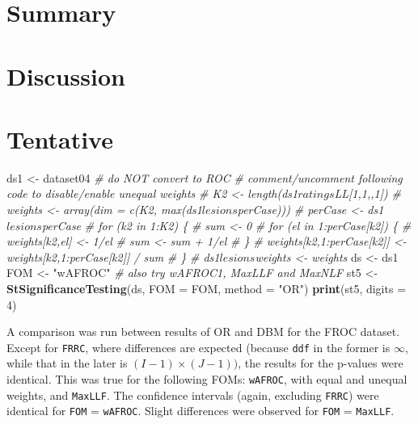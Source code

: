 \documentclass[
]{book}
\newenvironment{Shaded}{\begin{snugshade}}{\end{snugshade}}
\newcommand{\CommentTok}[1]{\textcolor[rgb]{0.56,0.35,0.01}{\textit{#1}}}
\newcommand{\DataTypeTok}[1]{\textcolor[rgb]{0.13,0.29,0.53}{#1}}
\newcommand{\DecValTok}[1]{\textcolor[rgb]{0.00,0.00,0.81}{#1}}
\newcommand{\KeywordTok}[1]{\textcolor[rgb]{0.13,0.29,0.53}{\textbf{#1}}}
\newcommand{\NormalTok}[1]{#1}
\newcommand{\StringTok}[1]{\textcolor[rgb]{0.31,0.60,0.02}{#1}}
\begin{document}
\hypertarget{ORApplications-Summary}{%
\section{Summary}\label{ORApplications-Summary}}

\hypertarget{ORApplications-Discussion}{%
\section{Discussion}\label{ORApplications-Discussion}}

\hypertarget{ToMullOver1-tentative}{%
\section{Tentative}\label{ToMullOver1-tentative}}

\begin{Shaded}
\begin{Highlighting}[]
\NormalTok{ds1 \textless{}{-}}\StringTok{ }\NormalTok{dataset04 }\CommentTok{\# do NOT convert to ROC}
\CommentTok{\# comment/uncomment following code to disable/enable unequal weights}
\CommentTok{\# K2 \textless{}{-} length(ds1$ratings$LL[1,1,,1])}
\CommentTok{\# weights \textless{}{-} array(dim = c(K2, max(ds1$lesions$perCase)))}
\CommentTok{\# perCase \textless{}{-} ds1$lesions$perCase}
\CommentTok{\# for (k2 in 1:K2) \{}
\CommentTok{\#   sum \textless{}{-} 0}
\CommentTok{\#   for (el in 1:perCase[k2]) \{}
\CommentTok{\#     weights[k2,el] \textless{}{-} 1/el}
\CommentTok{\#     sum \textless{}{-} sum + 1/el}
\CommentTok{\#   \}}
\CommentTok{\#   weights[k2,1:perCase[k2]] \textless{}{-} weights[k2,1:perCase[k2]] / sum}
\CommentTok{\# \}}
\CommentTok{\# ds1$lesions$weights \textless{}{-} weights}
\NormalTok{ds \textless{}{-}}\StringTok{ }\NormalTok{ds1}
\NormalTok{FOM \textless{}{-}}\StringTok{ "wAFROC"} \CommentTok{\# also try wAFROC1, MaxLLF and MaxNLF}
\NormalTok{st5 \textless{}{-}}\StringTok{ }\KeywordTok{StSignificanceTesting}\NormalTok{(ds, }\DataTypeTok{FOM =}\NormalTok{ FOM, }\DataTypeTok{method =} \StringTok{"OR"}\NormalTok{)}
\KeywordTok{print}\NormalTok{(st5, }\DataTypeTok{digits =} \DecValTok{4}\NormalTok{)}
\end{Highlighting}
\end{Shaded}

A comparison was run between results of OR and DBM for the FROC dataset. Except for \texttt{FRRC}, where differences are expected (because \texttt{ddf} in the former is \(\infty\), while that in the later is \((I-1)\times(J-1))\), the results for the p-values were identical. This was true for the following FOMs: \texttt{wAFROC}, with equal and unequal weights, and \texttt{MaxLLF}. The confidence intervals (again, excluding \texttt{FRRC}) were identical for \texttt{FOM} = \texttt{wAFROC}. Slight differences were observed for \texttt{FOM} = \texttt{MaxLLF}.
\end{document}
